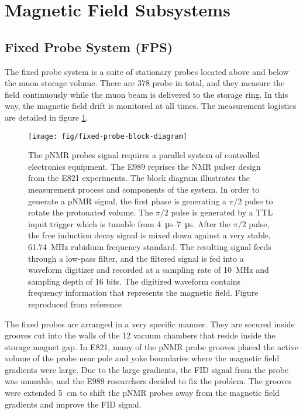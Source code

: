 \section{Magnetic Field Subsystems} \label{sec:field-subsystems}

\subsection{Fixed Probe System (FPS)}

The fixed probe system is a suite of stationary probes located above and below the muon storage volume.  There are 378 probe in total, and they measure the field continuously while the muon beam is delivered to the storage ring.  In this way, the magnetic field drift is monitored at all times.  The measurement logistics are detailed in figure \ref{fig:fixed-probe-block-diagram}.

\begin{figure}
\label{fig:fixed-probe-block-diagram}
\centering
\texttt{[image: fig/fixed-probe-block-diagram]}
\caption{
    The pNMR probes signal requires a parallel system of controlled electronics equipment.  The E989 reprises the NMR pulser design from the E821 experiments. The block diagram illustrates the measurement process and components of the system.  In order to generate a pNMR signal, the first phase is generating a $\pi/2$ pulse to rotate the protonated volume.  The $\pi/2$ pulse is generated by a TTL input trigger which is tunable from \SIrange{4}{7}{\micro\second}.  After the $\pi/2$ pulse, the free induction decay signal is mixed down against a very stable, \SI{61.74}{\MHz} rubidium frequency standard.  The resulting signal feeds through a low-pass filter, and the filtered signal is fed into a waveform digitizer and recorded at a sampling rate of \SI{10}{\MHz} and sampling depth of 16 bits.  The digitized waveform contains frequency information that represents the magnetic field. Figure reproduced from reference \cite{e989-tdr}
}
\end{figure}

The fixed probes are arranged in a very specific manner.  They are secured inside grooves cut into the walls of the 12 vacuum chambers that reside inside the storage magnet gap.  In E821, many of the pNMR probe grooves placed the active volume of the probe near pole and yoke boundaries where the magnetic field gradients were large.  Due to the large gradients, the FID signal from the probe was unusable, and the E989 researchers decided to fix the problem.  The grooves were extended \SI{5}{\cm} to shift the pNMR probes away from the magnetic field gradients and improve the FID signal.

